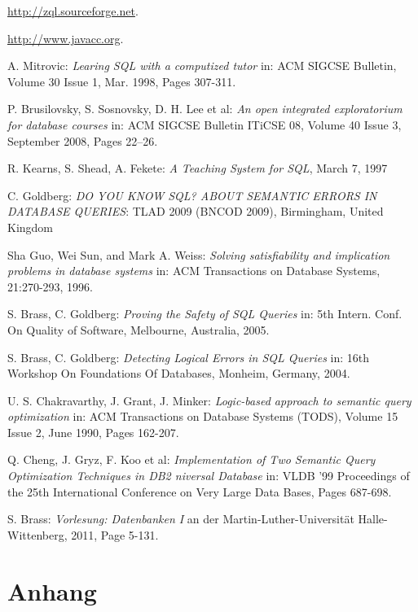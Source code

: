 \documentclass[12pt]{scrreprt}
\theoremstyle{remark}
\begin{document}
\begin{thebibliography}{9}
 \url{http://zql.sourceforge.net}.

 \newblock\url{http://www.javacc.org}.

A. Mitrovic: \emph{Learing SQL with a computized tutor} in: ACM SIGCSE Bulletin, Volume 30 		Issue 1, Mar. 1998, Pages 307-311. 

P. Brusilovsky, S. Sosnovsky, D. H. Lee et al: \emph{An open integrated exploratorium for 		database courses} in: ACM SIGCSE Bulletin  ITiCSE 08, Volume 40 Issue 3, September 2008, Pages 22--26.

R. Kearns, S. Shead, A. Fekete: \emph{A Teaching System for SQL}, March 7, 1997 

C. Goldberg: \emph{DO YOU KNOW SQL? ABOUT SEMANTIC ERRORS IN DATABASE QUERIES}: TLAD 2009 (BNCOD 2009), Birmingham, United Kingdom

Sha Guo, Wei Sun, and Mark A. Weiss: \emph{Solving satisfiability and implication problems in database systems} in: ACM Transactions on Database Systems, 21:270-293,
1996.

S. Brass, C. Goldberg: \emph{Proving the Safety of SQL Queries} in: 5th Intern. Conf. On Quality of Software, Melbourne, Australia, 2005.

S. Brass, C. Goldberg: \emph{Detecting Logical Errors in SQL Queries} in: 16th Workshop On Foundations Of Databases, Monheim, Germany, 2004.

U. S. Chakravarthy, J. Grant, J. Minker: \emph{Logic-based approach to semantic query optimization} in: ACM Transactions on Database Systems (TODS), Volume 15 Issue 2, June 1990, Pages 162-207.

Q. Cheng, J. Gryz, F. Koo et al: \emph{Implementation of Two Semantic Query Optimization Techniques in DB2 niversal Database} in: VLDB '99 Proceedings of the 25th International Conference on Very Large Data Bases, Pages 687-698.

S. Brass: \emph{Vorlesung: Datenbanken I} an der Martin-Luther-Universität Halle-Wittenberg, 2011, Page 5-131.

\end{thebibliography}


\chapter{Anhang}




\end{document}

